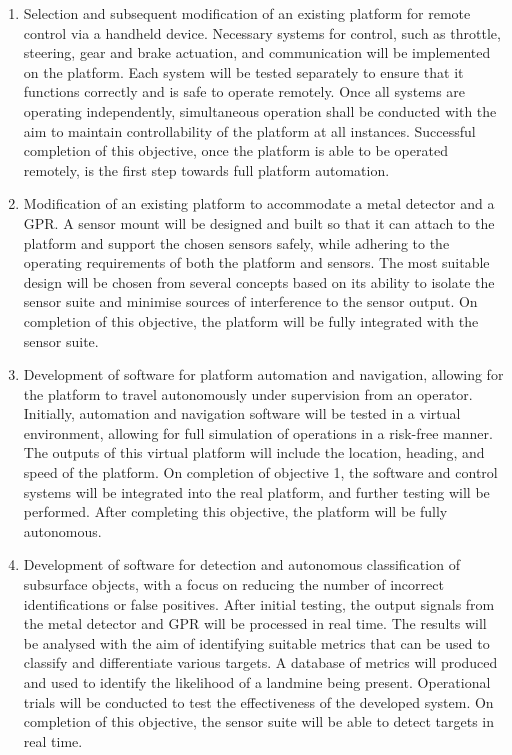 \documentclass[main.tex]{subfiles}
\begin{document}
\begin{enumerate}
\item Selection and subsequent modification of an existing platform for remote control via a handheld device. Necessary systems for control, such as throttle, steering, gear and brake actuation, and communication will be implemented on the platform. Each system will be tested separately to ensure that it functions correctly and is safe to operate remotely. Once all systems are operating independently, simultaneous operation shall be conducted with the aim to maintain controllability of the platform at all instances. Successful completion of this objective, once the platform is able to be operated remotely, is the first step towards full platform automation.  

\item Modification of an existing platform to accommodate a metal detector and a GPR. A sensor mount will be designed and built so that it can attach to the platform and support the chosen sensors safely, while adhering to the operating requirements of both the platform and sensors. The most suitable design will be chosen from several concepts based on its ability to isolate the sensor suite and minimise sources of interference to the sensor output. On completion of this objective, the platform will be fully integrated with the sensor suite.

\item Development of software for platform automation and navigation, allowing for the platform to travel autonomously under supervision from an operator. Initially, automation and navigation software will be tested in a virtual environment, allowing for full simulation of operations in a risk-free manner. The outputs of this virtual platform will include the location, heading, and speed of the platform. On completion of objective 1,  the software and control systems will be integrated into the real platform, and further testing will be performed. After completing this objective, the platform will be fully autonomous.

\item Development of software for detection and autonomous classification of subsurface objects, with a focus on reducing the number of incorrect identifications or false positives. After initial testing, the output signals from the metal detector and GPR will be processed in real time. The results will be analysed with the aim of identifying suitable metrics that can be used to classify and differentiate various targets. A database of metrics will produced and used to identify the likelihood of a landmine being present. Operational trials will be conducted to test the effectiveness of the developed system. On completion of this objective, the sensor suite will be able to detect targets in real time.


\end{enumerate}
\end{document}
